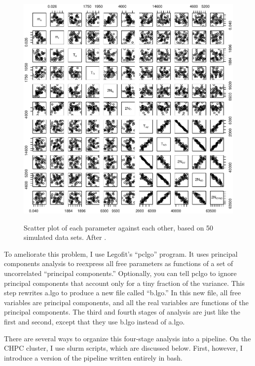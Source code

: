 \documentclass[11pt]{article}
\begin{document}
\begin{figure}
  {\centering
    \includegraphics[width=\linewidth]{detpairs.pdf}\\}
  \caption{Scatter plot of each parameter against each other, based on
    50 simulated data sets. After \citet[Fig.~3]{Rogers:PCJ-2-e32}.}
  \label{fig.pairs}
\end{figure}

To ameliorate this problem, I use Legofit's ``pclgo'' program. It uses
principal components analysis to reexpress all free parameters as
functions of a set of uncorrelated ``principal components.''
Optionally, you can tell pclgo to ignore principal components that
account only for a tiny fraction of the variance. This step rewrites
a.lgo to produce a new file called ``b.lgo.'' In this new file, all
free variables are principal components, and all the real variables
are functions of the principal components.  The third and fourth
stages of analysis are just like the first and second, except that they
use b.lgo instead of a.lgo.

There are several ways to organize this four-stage analysis into a
pipeline. On the CHPC cluster, I use slurm scripts, which are
discussed below. First, however, I introduce a version of the pipeline
written entirely in bash.
\end{document}
